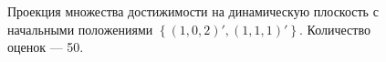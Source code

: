 \documentclass[10pt, a4paper]{article}
\begin{document}
\begin{figure}[H]
\caption{Проекция множества достижимости на динамическую плоскость с начальными положениями $\left\{(1,0,2)',(1,1,1)'\right\}$. Количество оценок --- 50.}
\end{figure}
\end{document}
